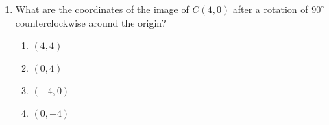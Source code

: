 \begin{enumerate}
\item What are the coordinates of the image of $C(4,0)$ after a rotation of $90^\circ$ counterclockwise around the origin? \vspace{0.5cm}
  \begin{multicols}{2}
    \begin{enumerate}
      \item $(4,4)$
      \item $(0,4)$
      \item $(-4,0)$
      \item $(0,-4)$
    \end{enumerate}
  \end{multicols}


\end{enumerate}


